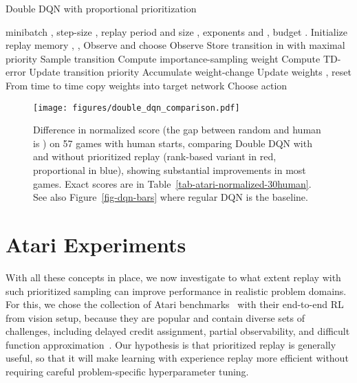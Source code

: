 \documentclass[a4paper]{article}
\begin{document}
\begin{algorithm}[tb]
   \caption{Double DQN with proportional prioritization}
   \label{alg-preplay}
\begin{algorithmic}[1]
    minibatch , step-size , replay period  and size , exponents  and , budget .
   \STATE Initialize replay memory , , 
   \STATE Observe  and choose 
   	  \STATE Observe 
      \STATE Store transition  in  with maximal priority 
      \IF{  } 
          \STATE Sample transition 
          \STATE Compute importance-sampling weight 
          \STATE Compute TD-error 
          \STATE Update transition priority  
          \STATE Accumulate weight-change 
        \ENDFOR
        \STATE Update weights , reset 
        \STATE From time to time copy weights into target network 
      \ENDIF
      \STATE Choose action 
   \ENDFOR
\end{algorithmic}
\end{algorithm}

\begin{figure}[t]
\vspace{-1em}
\centerline{
\texttt{[image: figures/double\_dqn\_comparison.pdf]}
}
\vspace{-1em}
\caption{
\label{fig-gen-bars}
Difference in normalized score (the gap between random and human is ) on 57 games with human starts, comparing Double
DQN with and without prioritized replay (rank-based variant in red, proportional in blue), showing substantial improvements in most games.  Exact scores are in Table~\ref{tab-atari-normalized-30human}.
See also Figure~\ref{fig-dqn-bars} where regular DQN is the baseline.
\vspace{-1em}
}
\end{figure}


\section{Atari Experiments} 

With all these concepts in place, 
we now investigate to what extent replay with such prioritized sampling 
can improve performance in realistic problem domains. 
For this, we chose the collection of Atari benchmarks~\citep{bellemare2012arcade} with their end-to-end RL from vision setup,
because they are popular and contain diverse sets of challenges, including delayed credit assignment, partial observability, and difficult function approximation~\citep{dqn-nature,double-dqn}.
Our hypothesis is that prioritized replay is generally useful, so that it will make learning with experience replay more efficient
without requiring careful problem-specific hyperparameter tuning.
\end{document}
